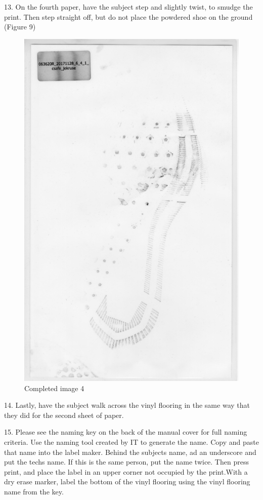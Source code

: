 13. On the fourth paper, have the subject step and slightly twist, to smudge the print. Then step straight off, but do not place the powdered shoe on the ground (Figure 9)

\begin{figure}[!htp]
\centering
\includegraphics[scale=0.3]{Baseline_Paper_4}
\caption{Completed image 4}
\label{Image 9}
\end{figure}

\newpage

14. Lastly, have the subject walk across the vinyl flooring in the same way that they did for the second sheet of paper. 

15. Please see the naming key on the back of the manual cover for full naming criteria. Use the naming tool created by IT to generate the name. Copy and paste that name into the label maker. Behind the subjects name, ad an underscore and put the techs name. If this is the same person, put the name twice. Then press print, and place the label in an upper corner not occupied by the print.With a dry erase marker, label the bottom of the vinyl flooring using the vinyl flooring name from the key.


